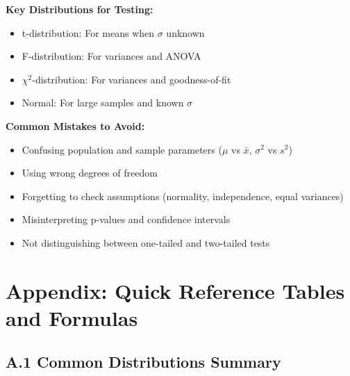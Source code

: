 \documentclass[12pt,a4paper]{amsart}
\theoremstyle{remark}
\begin{document}
\textbf{Key Distributions for Testing:}
\begin{itemize}
\item t-distribution: For means when $\sigma$ unknown
\item F-distribution: For variances and ANOVA
\item $\chi^2$-distribution: For variances and goodness-of-fit
\item Normal: For large samples and known $\sigma$
\end{itemize}

\textbf{Common Mistakes to Avoid:}
\begin{itemize}
\item Confusing population and sample parameters ($\mu$ vs $\bar{x}$, $\sigma^2$ vs $s^2$)
\item Using wrong degrees of freedom
\item Forgetting to check assumptions (normality, independence, equal variances)
\item Misinterpreting p-values and confidence intervals
\item Not distinguishing between one-tailed and two-tailed tests
\end{itemize}

\appendix

\section{Appendix: Quick Reference Tables and Formulas}

\subsection{A.1 Common Distributions Summary}
\end{document}

